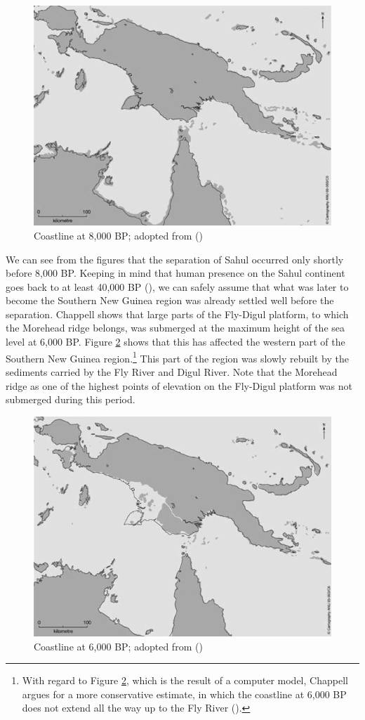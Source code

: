 \begin{figure}
    \includegraphics[width=.6\textwidth]{figures/chappell8k.png}
  \caption[Coastline at 8,000 BP]{Coastline at 8,000 BP; adopted from (\citealt[528]{Chappell:2005coastal})}
  \label{fig:figures_chappell8k}
\end{figure}%

We can see from the figures that the separation of Sahul occurred only shortly before 8,000 BP. Keeping in mind that human presence on the Sahul continent goes back to at least 40,000 BP (\citealt{Golson:2005intro}), we can safely assume that what was later to become the Southern New Guinea region was already settled well before the separation. Chappell shows that large parts of the Fly-Digul platform, to which the Morehead ridge belongs, was submerged at the maximum height of the sea level at 6,000 BP. Figure \ref{fig:figures_chappell6k} shows that this has affected the western part of the Southern New Guinea region.\footnote{With regard to Figure \ref{fig:figures_chappell6k}, which is the result of a computer model, Chappell argues for a more conservative estimate, in which the coastline at 6,000 BP does not extend all the way up to the Fly River (\citeyear[531]{Chappell:2005coastal}).} This part of the region was slowly rebuilt by the sediments carried by the Fly River and Digul River. Note that the Morehead ridge as one of the highest points of elevation on the Fly-Digul platform was not submerged during this period.

\begin{figure}
    \includegraphics[width=.6\textwidth]{figures/chappell6k.png}
  \caption[Coastline at 6,000 BP]{Coastline at 6,000 BP; adopted from (\citealt[528]{Chappell:2005coastal})}
  \label{fig:figures_chappell6k}
\end{figure}%

